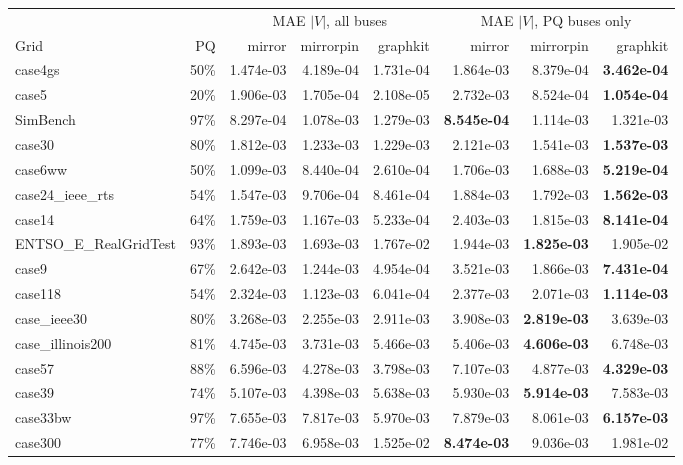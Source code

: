 \documentclass[10pt]{article}
\begin{document}
\begin{table}[H]
\centering
\small
\begin{tabular}{lrrrrrrr}
\toprule
 & & \multicolumn{3}{c}{MAE $|V|$, all buses} & \multicolumn{3}{c}{MAE $|V|$, PQ buses only} \\
\cmidrule(lr){3-5}\cmidrule(lr){6-8}
Grid & PQ & mirror & mirrorpin & graphkit & mirror & mirrorpin & graphkit \\
\midrule
case4gs & 50\% & 1.474e-03 & 4.189e-04 & 1.731e-04 & 1.864e-03 & 8.379e-04 & \textbf{3.462e-04} \\
case5 & 20\% & 1.906e-03 & 1.705e-04 & 2.108e-05 & 2.732e-03 & 8.524e-04 & \textbf{1.054e-04} \\
SimBench & 97\% & 8.297e-04 & 1.078e-03 & 1.279e-03 & \textbf{8.545e-04} & 1.114e-03 & 1.321e-03 \\
case30 & 80\% & 1.812e-03 & 1.233e-03 & 1.229e-03 & 2.121e-03 & 1.541e-03 & \textbf{1.537e-03} \\
case6ww & 50\% & 1.099e-03 & 8.440e-04 & 2.610e-04 & 1.706e-03 & 1.688e-03 & \textbf{5.219e-04} \\
case24\_ieee\_rts & 54\% & 1.547e-03 & 9.706e-04 & 8.461e-04 & 1.884e-03 & 1.792e-03 & \textbf{1.562e-03} \\
case14 & 64\% & 1.759e-03 & 1.167e-03 & 5.233e-04 & 2.403e-03 & 1.815e-03 & \textbf{8.141e-04} \\
ENTSO\_E\_RealGridTest & 93\% & 1.893e-03 & 1.693e-03 & 1.767e-02 & 1.944e-03 & \textbf{1.825e-03} & 1.905e-02 \\
case9 & 67\% & 2.642e-03 & 1.244e-03 & 4.954e-04 & 3.521e-03 & 1.866e-03 & \textbf{7.431e-04} \\
case118 & 54\% & 2.324e-03 & 1.123e-03 & 6.041e-04 & 2.377e-03 & 2.071e-03 & \textbf{1.114e-03} \\
case\_ieee30 & 80\% & 3.268e-03 & 2.255e-03 & 2.911e-03 & 3.908e-03 & \textbf{2.819e-03} & 3.639e-03 \\
case\_illinois200 & 81\% & 4.745e-03 & 3.731e-03 & 5.466e-03 & 5.406e-03 & \textbf{4.606e-03} & 6.748e-03 \\
case57 & 88\% & 6.596e-03 & 4.278e-03 & 3.798e-03 & 7.107e-03 & 4.877e-03 & \textbf{4.329e-03} \\
case39 & 74\% & 5.107e-03 & 4.398e-03 & 5.638e-03 & 5.930e-03 & \textbf{5.914e-03} & 7.583e-03 \\
case33bw & 97\% & 7.655e-03 & 7.817e-03 & 5.970e-03 & 7.879e-03 & 8.061e-03 & \textbf{6.157e-03} \\
case300 & 77\% & 7.746e-03 & 6.958e-03 & 1.525e-02 & \textbf{8.474e-03} & 9.036e-03 & 1.981e-02 \\

\end{tabular}
\end{table}
\end{document}
